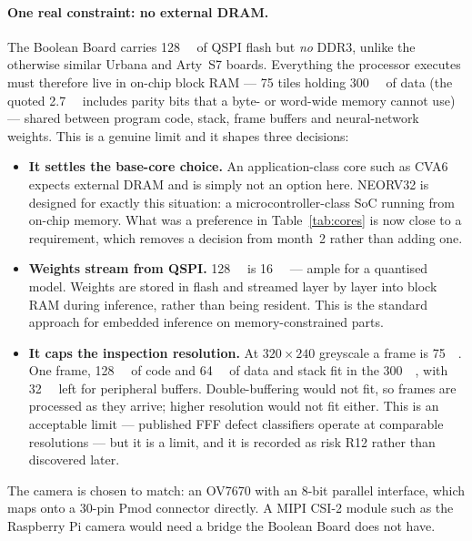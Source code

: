 \documentclass[11pt,a4paper]{article}
\begin{document}
\paragraph{One real constraint: no external DRAM.}
The Boolean Board carries \SI{128}{\mega\bit} of QSPI flash but \emph{no} DDR3,
unlike the otherwise similar Urbana and Arty~S7 boards. Everything the processor
executes must therefore live in on-chip block RAM ---
75 tiles holding \SI{300}{\kilo\byte} of data (the quoted \SI{2.7}{\mega\bit}
includes parity bits that a byte- or word-wide memory cannot use) --- shared
between program code,
stack, frame buffers and neural-network weights. This is a genuine limit and it
shapes three decisions:

\begin{itemize}
  \item \textbf{It settles the base-core choice.} An application-class core such
        as CVA6 expects external DRAM and is simply not an option here. NEORV32
        is designed for exactly this situation: a microcontroller-class SoC
        running from on-chip memory. What was a preference in
        Table~\ref{tab:cores} is now close to a requirement, which removes a
        decision from month~2 rather than adding one.
  \item \textbf{Weights stream from QSPI.} \SI{128}{\mega\bit} is
        \SI{16}{\mega\byte} --- ample for a quantised model. Weights are stored
        in flash and streamed layer by layer into block RAM during inference,
        rather than being resident. This is the standard approach for embedded
        inference on memory-constrained parts.
  \item \textbf{It caps the inspection resolution.} At \(320\times240\)
        greyscale a frame is \SI{75}{\kilo\byte}. One frame,
        \SI{128}{\kilo\byte} of code and \SI{64}{\kilo\byte} of data and stack
        fit in the \SI{300}{\kilo\byte}, with \SI{32}{\kilo\byte} left for
        peripheral buffers. Double-buffering would not fit, so frames are
        processed as they arrive; higher resolution would not fit either. This is an acceptable
        limit --- published FFF defect classifiers operate at comparable
        resolutions \cite{saluja2020warping} --- but it is a limit, and it is
        recorded as risk R12 rather than discovered later.
\end{itemize}

The camera is chosen to match: an OV7670 with an 8-bit parallel interface, which
maps onto a 30-pin Pmod connector directly. A MIPI CSI-2 module such as the
Raspberry Pi camera would need a bridge the Boolean Board does not have.
\end{document}
